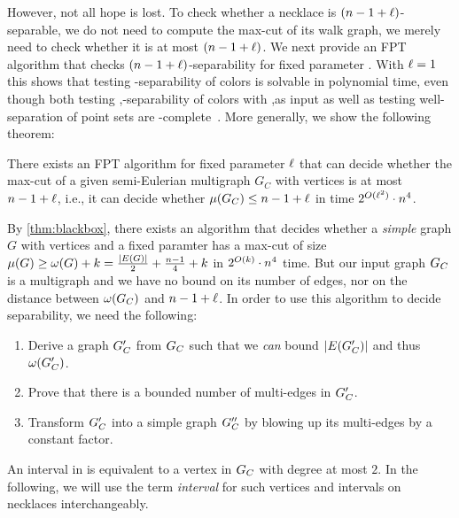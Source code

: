 \documentclass[a4paper,UKenglish,cleveref, thm-restate]{lipics-v2021}
\begin{document}
However, not all hope is lost. To check whether a necklace is  $(\dimension-1+\constB)$-separable, we do not need to compute the max-cut of its walk graph, we merely need to check whether it is at most $(\dimension-1+\constB)$. We next provide an FPT algorithm that checks $(\dimension - 1 + \constB)$-separability for fixed parameter \constB. With $\constB=1$ this shows that testing \dimension-separability of \dimension colors is solvable in polynomial time, even though both testing \sep-separability of \dimension colors with \sep as input as well as testing well-separation of point sets are \coNP-complete~\cite{WellSeparationCoNP}. More generally, we show the following theorem:
\begin{theorem}\label{thm:ourFPT}
    There exists an FPT algorithm for fixed parameter $\constB$ that can decide whether the max-cut of a given semi-Eulerian multigraph $G_C$ with \dimension vertices is at most $\dimension-1+\constB$, i.e., it can decide whether $\mu(G_C)\leq \dimension-1+\constB$ in time $2^{O(\constB^2)}\cdot \dimension^4$.
\end{theorem}

By \cref{thm:blackbox}, there exists an algorithm that decides whether a \emph{simple} graph $G$ with \dimension vertices and a fixed paramter \const has a max-cut of size $\mu(G) \geq \bound(G)+\const = \frac{\abs{E(G)}}{2}+ \frac{\dimension-1}{4}+\const$ in $2^{O(\const)}\cdot \dimension^4$ time.
But our input graph $G_\Colors$ is a multigraph and we have no bound on its number of edges, nor on the distance between $\bound(G_\Colors)$ and $\dimension-1+\constB$.
In order to use this algorithm to decide separability, we need the following:
\begin{enumerate}


\item Derive a graph $G_\Colors'$ from $G_\Colors$ such that we \emph{can} bound $\abs{E(G_\Colors')}$ and thus $\bound(G_\Colors')$.


\item Prove that there is a bounded number of multi-edges in $G_\Colors'$.
\item Transform $G_\Colors'$ into a simple graph $G_\Colors''$ by blowing up its multi-edges by a constant factor.
\end{enumerate}



An interval in \Colors is equivalent to a vertex in $G_\Colors$ with degree at most $2$.
In the following, we will use the term \emph{interval} for such vertices and intervals on necklaces interchangeably.
\end{document}
